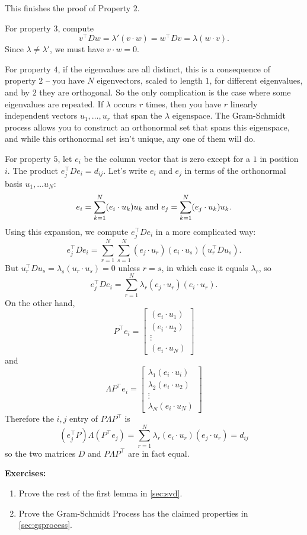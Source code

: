 \documentclass[
]{article}
\begin{document}
This finishes the proof of Property \(2\).

For property \(3\), compute \[
v^{\intercal}Dw = \lambda'(v\cdot w)=w^{\intercal}Dv = \lambda (w\cdot v).
\] Since \(\lambda\not=\lambda'\), we must have \(v\cdot w=0\).

For property \(4\), if the eigenvalues are all distinct, this is a
consequence of property \(2\) -- you have \(N\) eigenvectors, scaled to
length \(1\), for different eigenvalues, and by \(2\) they are
orthogonal. So the only complication is the case where some eigenvalues
are repeated. If \(\lambda\) occurs \(r\) times, then you have \(r\)
linearly independent vectors \(u_{1},\ldots, u_{r}\) that span the
\(\lambda\) eigenspace. The Gram-Schmidt process allows you to construct
an orthonormal set that spans this eigenspace, and while this
orthonormal set isn't unique, any one of them will do.

For property \(5\), let \(e_{i}\) be the column vector that is zero
except for a \(1\) in position \(i\). The product
\(e_{j}^{\intercal}De_{i}=d_{ij}\). Let's write \(e_{i}\) and \(e_{j}\)
in terms of the orthonormal basis \(u_{1},\ldots u_{N}\): \[
e_{i} = \sum_{k=1}^{N} (e_{i}\cdot u_{k})u_k \hbox{ and } e_{j} = \sum_{k=1}^{N}(e_{j}\cdot u_{k})u_{k}.
\] Using this expansion, we compute \(e_{j}^{\intercal}De_{i}\) in a
more complicated way: \[
e_{j}^{\intercal}De_{i} = \sum_{r=1}^{N}\sum_{s=1}^{N} (e_{j}\cdot u_{r})(e_{i}\cdot u_{s})(u_{r}^{\intercal}Du_{s}).
\] But \(u_{r}^{\intercal}Du_{s}=\lambda_{s}(u_{r}\cdot u_{s})=0\)
unless \(r=s\), in which case it equals \(\lambda_{r}\), so \[
e_{j}^{\intercal}De_{i} = \sum_{r=1}^{N} \lambda_{r}(e_{j}\cdot u_{r})(e_{i}\cdot u_{r}).
\] On the other hand, \[
P^{\intercal}e_{i} = \left[\begin{matrix} (e_{i}\cdot u_{1})\\ (e_{i}\cdot u_{2})\\ \vdots \\(e_{i}\cdot u_{N})\end{matrix}\right]
\] and \[
\Lambda P^{\intercal}e_{i} = \left[\begin{matrix} \lambda_{1}(e_{i}\cdot u_{i})\\ \lambda_{2}(e_{i}\cdot u_{2})\\ \vdots \\ \lambda_{N}(e_{i}\cdot u_{N})\end{matrix}\right]
\] Therefore the \(i,j\) entry of \(P\Lambda P^{\intercal}\) is \[
(e_{j}^{\intercal}P)\Lambda (P^{\intercal}e_{j}) = \sum_{r=1}^{N} \lambda_{r}(e_{i}\cdot u_{r})(e_{j}\cdot u_{r}) = d_{ij}
\] so the two matrices \(D\) and \(P\Lambda P^{\intercal}\) are in fact
equal.

\textbf{Exercises:}

\begin{enumerate}
\def\labelenumi{\arabic{enumi}.}
\item
  Prove the rest of the first lemma in \cref{sec:svd}.
\item
  Prove the Gram-Schmidt Process has the claimed properties in
  \cref{sec:gsprocess}.
\end{enumerate}
\end{document}
